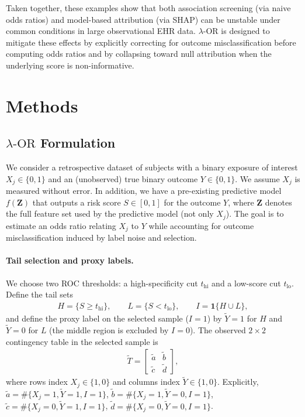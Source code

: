 \documentclass[pdflatex,sn-mathphys-num]{sn-jnl}%
\def\EQSP{3pt}
\newcommand{\cgather}[2][\EQSP]{\begingroup\setlength\abovedisplayskip{#1}\setlength\belowdisplayskip{#1}\begin{gather} #2 \end{gather}\endgroup\noindent}
\newcommand{\SPOR}{\textrm{$\lambda$-OR}}
\theoremstyle{thmstyleone}%
\theoremstyle{thmstyletwo}%
\theoremstyle{thmstylethree}%
\begin{document}
Taken together, these examples show that both association screening (via naive odds ratios) and model-based attribution (via SHAP) can be unstable under common conditions in large observational EHR data. $\SPOR$ is designed to mitigate these effects by explicitly correcting for outcome misclassification before computing odds ratios and by collapsing toward null attribution when the underlying score is non-informative.

\section{Methods}
\subsection{$\SPOR$ Formulation}
We consider a retrospective dataset of subjects with a binary exposure of interest $X_j\in\{0,1\}$ and an (unobserved) true binary outcome $Y\in\{0,1\}$. We assume $X_j$ is measured without error. In addition, we have a pre-existing predictive model $f(\mathbf{Z})$ that outputs a risk score $S\in[0,1]$ for the outcome $Y$, where $\mathbf{Z}$ denotes the full feature set used by the predictive model (not only $X_j$). The goal is to estimate an odds ratio relating $X_j$ to $Y$ while accounting for outcome misclassification induced by label noise and selection.

\paragraph{Tail selection and proxy labels.}
We choose two ROC thresholds: a high-specificity cut $t_{\mathrm{hi}}$ and a low-score cut $t_{\mathrm{lo}}$. Define the tail sets
\cgather{
H=\{S\ge t_{\mathrm{hi}}\},\qquad L=\{S< t_{\mathrm{lo}}\},\qquad I=\mathbf{1}\{H\cup L\},
}
and define the proxy label on the selected sample ($I=1$) by $\tilde Y=1$ for $H$ and $\tilde Y=0$ for $L$ (the middle region is excluded by $I=0$). The observed $2\times2$ contingency table in the selected sample is
\cgather{
\tilde{T}=\begin{bmatrix}
\tilde{a} & \tilde{b}\\
\tilde{c} & \tilde{d}
\end{bmatrix}, 
}
where rows index $X_j\in\{1,0\}$ and columns index $\tilde Y\in\{1,0\}$. Explicitly,
$\tilde a=\#\{X_j=1,\tilde Y=1,I=1\}$,
$\tilde b=\#\{X_j=1,\tilde Y=0,I=1\}$,
$\tilde c=\#\{X_j=0,\tilde Y=1,I=1\}$,
$\tilde d=\#\{X_j=0,\tilde Y=0,I=1\}$.
%
\end{document}
